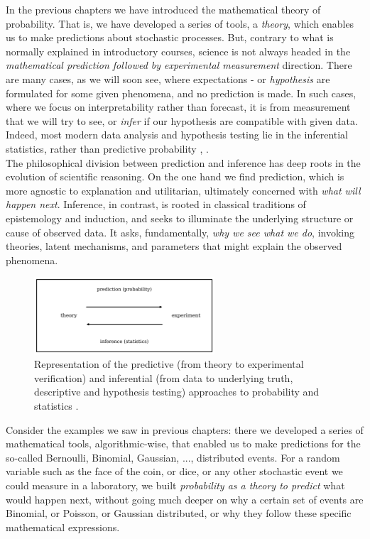 \documentclass{book}
\begin{document}
In the previous chapters we have introduced the mathematical theory of probability. That is, we have developed a series of tools, a \textit{theory}, which enables us to make predictions about stochastic processes. But, contrary to what is normally explained in introductory courses, science is not always headed in the \textit{mathematical prediction followed by experimental measurement} direction. There are many cases, as we will soon see, where expectations - or \textit{hypothesis} are formulated for some given phenomena, and no prediction is made. In such cases, where we focus on interpretability rather than forecast, it is from measurement that we will try to see, or \textit{infer} if our hypothesis are compatible with given data. Indeed, most modern data analysis and hypothesis testing lie in the inferential statistics, rather than predictive probability \cite{fisher1925},  \cite{fisher1935}.\\

The philosophical division between prediction and inference has deep roots in the evolution of scientific reasoning. On the one hand we find prediction, which is more agnostic to explanation and utilitarian, ultimately concerned with \textit{what will happen next}. Inference, in contrast, is rooted in classical traditions of epistemology and induction, and seeks to illuminate the underlying structure or cause of observed data. It asks, fundamentally, \textit{why we see what we do}, invoking theories, latent mechanisms, and parameters that might explain the observed phenomena.\\

\begin{figure}[ht]
    \centering
    \includegraphics[width=0.6\textwidth]{figures/chapter4/probability_vs_statistics.png}
    \caption{Representation of the predictive (from theory to experimental verification) and inferential (from data to underlying truth, descriptive and hypothesis testing) approaches to probability and statistics \cite{pearson1900}.}
    \label{fig:prob_vs_stats1}
\end{figure}

Consider the examples we saw in previous chapters: there we developed a series of mathematical tools, algorithmic-wise, that enabled us to make predictions for the so-called Bernoulli, Binomial, Gaussian, ..., distributed events. For a random variable such as the face of the coin, or dice, or any other stochastic event we could measure in a laboratory, we built \textit{probability as a theory to predict} what would happen next, without going much deeper on why a certain set of events are Binomial, or Poisson, or Gaussian distributed, or why they follow these specific mathematical expressions.\\
\end{document}
